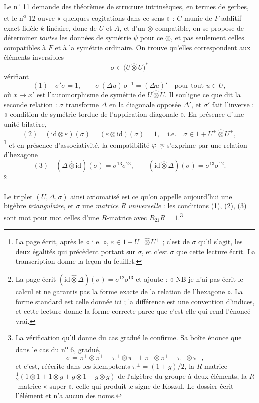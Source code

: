 \documentclass[11pt,a4paper]{article}
\begin{document}
Le n\textsuperscript{o} 11 demande des théorèmes de structure intrinsèques, en
termes de gerbes, et le n\textsuperscript{o} 12 ouvre « quelques cogitations
dans ce sens » : $\underline{C}$ munie de $F$ additif exact fidèle
$k$-linéaire, donc de $U$ et $A$, et d'un $\otimes$ compatible, on se propose
de déterminer \emph{toutes} les données de symétrie $\psi$ pour ce $\otimes$,
et pas seulement celles compatibles à $F$ et à la symétrie ordinaire. On
trouve qu'elles correspondent aux éléments inversibles
\[
\sigma \in \bigl( U \mathbin{\widehat{\otimes}} U \bigr)^{*}
\]
vérifiant
\[
(1)\quad \sigma'\sigma = 1 ,
\qquad
\sigma\,(\Delta u)\,\sigma^{-1} = (\Delta u)' \quad \text{pour tout } u \in U ,
\]
où $x \mapsto x'$ est l'automorphisme de symétrie de $U
\mathbin{\widehat{\otimes}} U$. Il souligne ce que dit la seconde relation :
$\sigma$ transforme $\Delta$ en la diagonale opposée $\Delta'$, et $\sigma'$
fait l'inverse : « condition de symétrie tordue de l'application
diagonale ». En présence d'une unité bilatère,
\[
(2)\quad (\mathrm{id} \otimes \varepsilon)(\sigma) =
(\varepsilon \otimes \mathrm{id})(\sigma) = 1 ,
\quad\text{i.e.}\quad
\sigma \in 1 + U^{+} \mathbin{\widehat{\otimes}} U^{+} ,
\]
\footnote{La page écrit, après le « i.e. », $\varepsilon \in 1 + U^{+}
\mathbin{\widehat{\otimes}} U^{+}$ ; c'est de $\sigma$ qu'il s'agit, les deux
égalités qui précèdent portant sur $\sigma$, et c'est $\sigma$ que cette
lecture écrit. La transcription donne la leçon du feuillet.}
et en présence d'associativité, la compatibilité $\varphi$--$\psi$ s'exprime
par une relation d'hexagone
\[
(3)\quad (\Delta \mathbin{\widehat{\otimes}} \mathrm{id})(\sigma)
= \sigma^{13}\sigma^{23} ,
\qquad
(\mathrm{id} \mathbin{\widehat{\otimes}} \Delta)(\sigma)
= \sigma^{13}\sigma^{12} .
\]
\footnote{La page écrit $(\mathrm{id} \mathbin{\widehat{\otimes}}
\Delta)(\sigma) = \sigma^{12}\sigma^{13}$ et ajoute : « NB je n'ai pas écrit le
calcul et ne garantis pas la forme exacte de la relation de l'hexagone ». La
forme standard est celle donnée ici ; la différence est une convention
d'indices, et cette lecture donne la forme correcte parce que c'est elle qui
rend l'énoncé vrai.}

Le triplet $(U, \Delta, \sigma)$ ainsi axiomatisé est ce qu'on appelle
aujourd'hui une bigèbre \emph{triangulaire}, et $\sigma$ une \emph{matrice
$R$ universelle} : les conditions (1), (2), (3) sont mot pour mot celles d'une
$R$-matrice avec $R_{21}R = 1$.\footnote{La vérification qu'il donne du cas
gradué le confirme. Sa boîte énonce que dans le cas du
n\textsuperscript{o} 6, gradué,
\[
\sigma = \pi^{+} \otimes \pi^{+} + \pi^{+} \otimes \pi^{-}
+ \pi^{-} \otimes \pi^{+} - \pi^{-} \otimes \pi^{-} ,
\]
et c'est, réécrite dans les idempotents $\pi^{\pm} = (1 \pm g)/2$,
la $R$-matrice $\frac{1}{2}(1 \otimes 1 + 1 \otimes g + g \otimes 1 - g \otimes
g)$ de l'algèbre du groupe à deux éléments, la $R$-matrice « super », celle
qui produit le signe de Koszul. Le dossier écrit l'élément et n'a aucun des
noms.}
\end{document}
